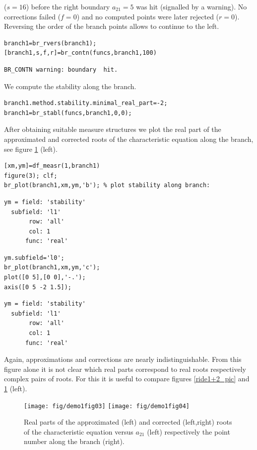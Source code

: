 \documentclass[10pt]{scrartcl}
\begin{document}
($s=16$) before the right boundary $a_{21}=5$ was hit (signalled by a
warning).  No corrections failed ($f=0$) and no computed points were
later rejected ($r=0$). Reversing the order of the branch points
allows to continue to the left.  
\begin{lstlisting}
branch1=br_rvers(branch1);
[branch1,s,f,r]=br_contn(funcs,branch1,100)  
\end{lstlisting}
{\small
\begin{verbatim} 
BR_CONTN warning: boundary  hit.
\end{verbatim}}
We compute the stability along the branch.
\begin{lstlisting}
branch1.method.stability.minimal_real_part=-2;
branch1=br_stabl(funcs,branch1,0,0);  
\end{lstlisting}
After obtaining suitable measure structures we plot the real part of
the approximated and corrected roots of the characteristic equation
along the branch, see figure \ref{ride3+4_pic} (left).  
\begin{lstlisting} 
[xm,ym]=df_measr(1,branch1) 
figure(3); clf;
br_plot(branch1,xm,ym,'b'); % plot stability along branch:
\end{lstlisting}
{\small
\begin{verbatim}
ym = field: 'stability'
  subfield: 'l1'
       row: 'all'
       col: 1
      func: 'real'
\end{verbatim}
}
\begin{lstlisting} 
ym.subfield='l0'; 
br_plot(branch1,xm,ym,'c');
plot([0 5],[0 0],'-.');
axis([0 5 -2 1.5]);
\end{lstlisting}
{\small
\begin{verbatim}
ym = field: 'stability'
  subfield: 'l1'
       row: 'all'
       col: 1
      func: 'real'
\end{verbatim}}
Again, approximations and 
corrections are nearly indistinguishable. From this figure alone it
is not clear which real parts correspond to real roots respectively
complex pairs of roots. For this it is 
useful to compare figures \ref{ride1+2_pic} and \ref{ride3+4_pic} (left).
\begin{figure}[htbp]
  \begin{center}
    \texttt{[image: fig/demo1fig03]}%
    \texttt{[image: fig/demo1fig04]}
  \end{center}
  \caption{\label{ride3+4_pic}Real parts of
    the approximated (left) and corrected (left,right)
    roots of the characteristic equation
    versus $a_{21}$ (left) respectively the point number along the branch
    (right). } 
\end{figure}
\end{document}
